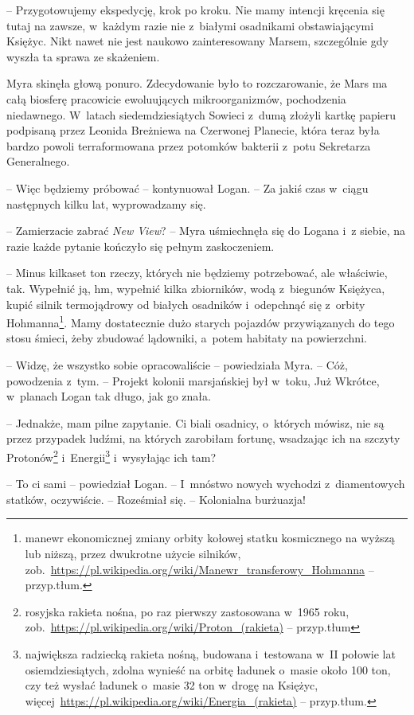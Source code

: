 \documentclass[oneside,polish,11pt,sfheadings]{mwbk}
\begin{document}
-- Przygotowujemy ekspedycję, krok po kroku. Nie
mamy intencji kręcenia się tutaj na zawsze, w~każdym razie nie z~białymi
osadnikami obstawiającymi Księżyc. Nikt nawet nie jest naukowo
zainteresowany Marsem, szczególnie gdy wyszła ta sprawa ze skażeniem.

Myra skinęła głową ponuro. Zdecydowanie było to rozczarowanie, że Mars
ma całą biosferę pracowicie ewoluujących mikroorganizmów, pochodzenia
niedawnego. W~latach siedemdziesiątych Sowieci z~dumą złożyli kartkę
papieru podpisaną przez Leonida Breżniewa na Czerwonej Planecie, która
teraz była bardzo powoli terraformowana przez potomków bakterii z~potu
Sekretarza Generalnego.

-- Więc będziemy próbować -- kontynuował Logan. -- Za jakiś czas w~ciągu
następnych kilku lat, wyprowadzamy się.

-- Zamierzacie zabrać \textit{New View}? -- Myra uśmiechnęła się do Logana i~z siebie, na razie każde pytanie kończyło się pełnym zaskoczeniem.

-- Minus kilkaset ton rzeczy, których nie będziemy potrzebować, ale
właściwie, tak. Wypełnić ją, hm, wypełnić kilka zbiorników, wodą z~biegunów Księżyca, kupić silnik termojądrowy od białych osadników i~odepchnąć się z~orbity Hohmanna\footnote{ manewr ekonomicznej zmiany orbity
kołowej statku kosmicznego na wyższą lub niższą, przez dwukrotne użycie
silników,
zob.~\url{https://pl.wikipedia.org/wiki/Manewr\_transferowy\_Hohmanna}
-- przyp.tłum.}. Mamy dostatecznie dużo starych pojazdów przywiązanych
do tego stosu śmieci, żeby zbudować lądowniki, a~potem habitaty na
powierzchni.

-- Widzę, że wszystko sobie opracowaliście -- powiedziała Myra. -- Cóż,
powodzenia z~tym. -- Projekt kolonii marsjańskiej był w~toku, Już
Wkrótce, w~planach Logan tak długo, jak go znała. 

-- Jednakże, mam pilne
zapytanie. Ci biali osadnicy, o~których mówisz, nie są przez przypadek
ludźmi, na których zarobiłam fortunę, wsadzając ich na szczyty
Protonów\footnote{ rosyjska rakieta nośna, po raz pierwszy zastosowana w~1965
roku,
zob.~\url{https://pl.wikipedia.org/wiki/Proton\_(rakieta)}
-- przyp.tłum} i~Energii\footnote{ największa radziecką rakieta nośną,
budowana i~testowana w~II połowie lat osiemdziesiątych, zdolna wynieść
na orbitę ładunek o~masie około 100 ton, czy też wysłać ładunek o~masie
32 ton w~drogę na Księżyc,
więcej~\url{https://pl.wikipedia.org/wiki/Energia\_(rakieta)}
-- przyp.tłum.} i~wysyłając ich tam?

-- To ci sami -- powiedział Logan. -- I~mnóstwo nowych wychodzi z~diamentowych statków, oczywiście. -- Roześmiał się. -- Kolonialna
burżuazja!
\end{document}
